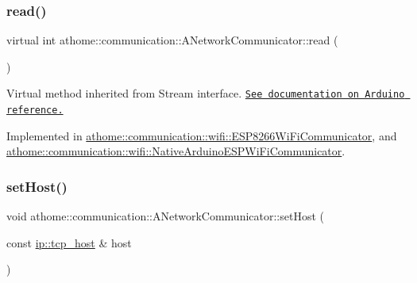 \mbox{\label{classathome_1_1communication_1_1_a_network_communicator_a88d3c4366daf48865ab48b22eb62d610}} 
\subsubsection{\texorpdfstring{read()}{read()}}
{\footnotesize\ttfamily virtual int athome\+::communication\+::\+A\+Network\+Communicator\+::read (\begin{DoxyParamCaption}{ }\end{DoxyParamCaption})\hspace{0.3cm}{\ttfamily [pure virtual]}}

Virtual method inherited from Stream interface. \href{https://www.arduino.cc/reference/en/language/functions/communication/stream/streamread/}{\tt See documentation on Arduino reference.} 

Implemented in \mbox{\hyperlink{classathome_1_1communication_1_1wifi_1_1_e_s_p8266_wi_fi_communicator_a1cadc570e912c164279ef0ebc5b178a5}{athome\+::communication\+::wifi\+::\+E\+S\+P8266\+Wi\+Fi\+Communicator}}, and \mbox{\hyperlink{classathome_1_1communication_1_1wifi_1_1_native_arduino_e_s_p_wi_fi_communicator_a07da3b2bf99edad18fb95b6879dbf0f7}{athome\+::communication\+::wifi\+::\+Native\+Arduino\+E\+S\+P\+Wi\+Fi\+Communicator}}.

\mbox{\label{classathome_1_1communication_1_1_a_network_communicator_a2c19d9918fc1d85d1768bfd0ae0bd4d4}} 
\subsubsection{\texorpdfstring{set\+Host()}{setHost()}}
{\footnotesize\ttfamily void athome\+::communication\+::\+A\+Network\+Communicator\+::set\+Host (\begin{DoxyParamCaption}\item[{const \mbox{\hyperlink{structathome_1_1communication_1_1ip_1_1s__host}{ip\+::tcp\+\_\+host}} \&}]{host }\end{DoxyParamCaption})}

